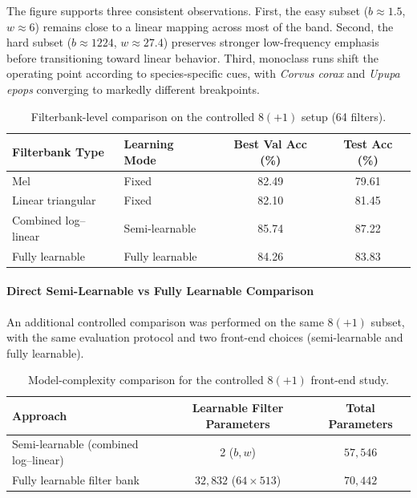 \documentclass[a4paper,singleside,12pt]{report} %
\begin{document}
	The figure supports three consistent observations. First, the easy subset (\(b\approx 1.5\), \(w\approx 6\)) remains close to a linear mapping across most of the band. Second, the hard subset (\(b\approx 1224\), \(w\approx 27.4\)) preserves stronger low-frequency emphasis before transitioning toward linear behavior. Third, monoclass runs shift the operating point according to species-specific cues, with \emph{Corvus corax} and \emph{Upupa epops} converging to markedly different breakpoints.

	\begin{table}[H]
		\centering
		\scriptsize
		\renewcommand{\arraystretch}{1.15}
		\setlength{\tabcolsep}{6pt}
		\caption{Filterbank-level comparison on the controlled \(8(+1)\) setup (64 filters).}
		\label{tab:filterbank_comparison}
		\begin{tabular}{|p{}|p{}|c|c|}
			\hline
			Filterbank Type & Learning Mode & Best Val Acc (\%) & Test Acc (\%) \\
			\hline
			Mel & Fixed & 82.49 & 79.61 \\
			\hline
			Linear triangular & Fixed & 82.10 & 81.45 \\
			\hline
			Combined log--linear & Semi-learnable & 85.74 & 87.22 \\
			\hline
			Fully learnable & Fully learnable & 84.26 & 83.83 \\
			\hline
		\end{tabular}
	\end{table}

	\paragraph{Direct Semi-Learnable vs Fully Learnable Comparison}
	An additional controlled comparison was performed on the same \(8(+1)\) subset, with the same evaluation protocol and two front-end choices (semi-learnable and fully learnable).

	\begin{table}[H]
		\centering
		\scriptsize
		\renewcommand{\arraystretch}{1.15}
		\setlength{\tabcolsep}{6pt}
		\caption{Model-complexity comparison for the controlled \(8(+1)\) front-end study.}
		\label{tab:semi_vs_fully_complexity}
		\begin{tabular}{|p{}|c|c|}
			\hline
			Approach & Learnable Filter Parameters & Total Parameters \\
			\hline
			Semi-learnable (combined log--linear) & 2 (\(b, w\)) & \(57{,}546\) \\
			\hline
			Fully learnable filter bank & \(32{,}832\) (\(64\times 513\)) & \(70{,}442\) \\
			\hline
		\end{tabular}
	\end{table}
\end{document}
